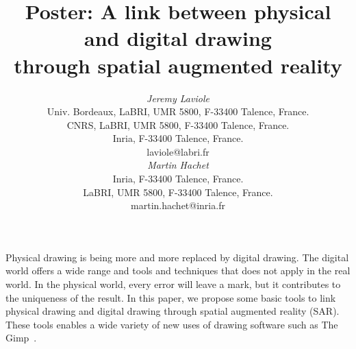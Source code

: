 \documentclass{article}
\begin{document}




\title{Poster: A link between physical and digital drawing \\
       through spatial augmented reality}


\author{
\parbox[t]{9cm}{\centering
	     {\em Jeremy Laviole}\\
	     Univ. Bordeaux, LaBRI, UMR 5800, F-33400 Talence, France.\\
         CNRS, LaBRI, UMR 5800, F-33400 Talence, France.\\
	     Inria, F-33400 Talence, France.\\
	     laviole@labri.fr}
\parbox[t]{9cm}{\centering
	     {\em Martin Hachet}\\
	     Inria, F-33400 Talence, France.\\
	     LaBRI, UMR 5800, F-33400 Talence, France.\\
	     martin.hachet@inria.fr}
}

\maketitle

\abstract

Physical drawing is being more and more replaced by digital drawing. The digital world offers a wide range and tools and techniques that does not apply in the real world. In the physical world, every error will leave a mark, but it contributes to the uniqueness of the result. In this paper, we propose some basic tools to link physical drawing and digital drawing through spatial augmented reality (SAR). These tools enables a wide variety of new uses of drawing software such as The Gimp~\cite{gimp2004image}. 
\end{document}
